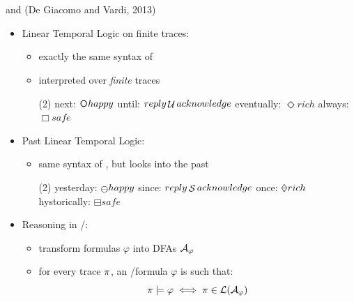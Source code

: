 \documentclass[10pt]{beamer}
\begin{document}
\section{\LTLfToDFA}
\begin{frame}{\PLTL and \LTLf (De Giacomo and Vardi, 2013)}
	\begin{itemize}
		\item Linear Temporal Logic on finite traces: \LTLf
			\begin{itemize}
				\item exactly the same syntax of \LTL
				\item interpreted over \textit{finite} traces
	
			\begin{tasks}[counter-format = -](2)
				\task next: $\Next happy$
				\task until: $reply \mathop{\mathcal{U}} acknowledge$
				\task eventually: $\Diamond rich$
				\task always: $\Box safe$
			\end{tasks}
			
			\end{itemize}

		\item Past Linear Temporal Logic: \PLTL
			\begin{itemize}
				\item same syntax of \LTLf, but looks into the past
	
				\begin{tasks}[counter-format = -](2)
					\task yesterday: $\Yesterday happy$
					\task since: $reply \mathop{\mathcal{S}} acknowledge$
					\task once: $\Once rich$
					\task hystorically: $\boxminus safe$					
				\end{tasks}
			\end{itemize}
		
		\item Reasoning in \LTLf/\PLTL:
			\begin{itemize}
				\item transform formulas $\varphi$ into DFAs $\mathcal{A}_\varphi$
				\item for every trace $\pi$, an \LTLf/\PLTL formula $\varphi$ is such that: \[\pi \models \varphi \iff \pi \in \mathcal{L}(\mathcal{A}_\varphi)\]
			\end{itemize}
	\end{itemize}
\end{frame}
\end{document}
